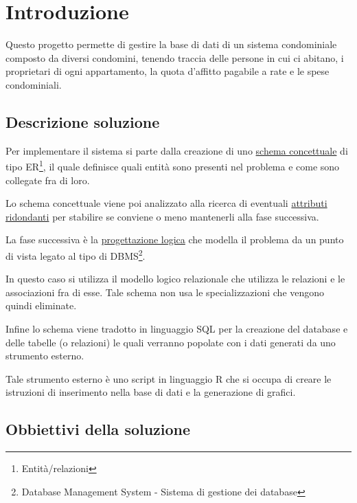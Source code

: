 \section{Introduzione}

Questo progetto permette di gestire la base di dati di
un sistema condominiale composto da diversi condomini,
tenendo traccia delle persone in cui ci abitano, i
proprietari di ogni appartamento, la quota d'affitto
pagabile a rate e le spese condominiali.

\subsection{Descrizione soluzione}

Per implementare il sistema si parte dalla creazione di uno
\hyperref[schemaER]{schema concettuale}
di tipo ER\footnote{Entità/relazioni},
il quale definisce quali entità sono presenti nel problema
e come sono collegate fra di loro.

Lo schema concettuale viene poi analizzato alla ricerca di
eventuali
\hyperref[ridondanze]{attributi ridondanti}
per stabilire se conviene o meno mantenerli alla fase successiva.

La fase successiva è la
\hyperref[logico]{progettazione logica}
che modella il problema da un punto di vista legato al tipo di
DBMS\footnote{Database Management System - Sistema di gestione dei database}.

In questo caso si utilizza il modello logico relazionale che
utilizza le relazioni e le associazioni fra di esse. Tale schema
non usa le specializzazioni che vengono quindi eliminate.


Infine lo schema viene tradotto in linguaggio SQL per la
creazione del database e delle tabelle (o relazioni) le quali
verranno popolate con i dati generati da uno strumento esterno.

Tale strumento esterno è uno script in linguaggio R che si
occupa di creare le istruzioni di inserimento nella base di dati
e la generazione di grafici.

\subsection{Obbiettivi della soluzione}

